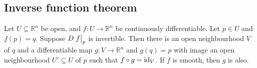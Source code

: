 \subsection{Inverse function theorem}
\begin{theorem}
	Let \( U \subseteq \mathbb R^n \) be open, and \( f \colon U \to \mathbb R^n \) be continuously differentiable.
	Let \( p \in U \) and \( f(p) = q \).
	Suppose \( D\eval{f}_p \) is invertible.
	Then there is an open neighbourhood \( V \) of \( q \) and a differentiable map \( g \colon V \to \mathbb R^n \) and \( g(q) = p \) with image an open neighbourhood \( U' \subseteq U \) of \( p \) such that \( f \circ g = \operatorname{id}_V \).
	If \( f \) is smooth, then \( g \) is also.
\end{theorem}
